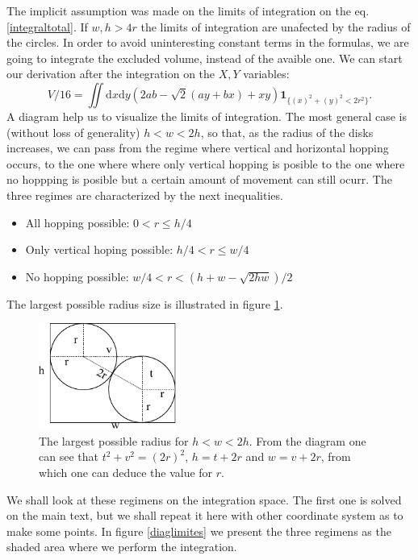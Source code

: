 \documentclass[letterpaper,10pt, jcp, aps]{revtex4-1}
\newcommand{\rd}{\!\mathrm{d}}
\newcommand{\indicator}[1]{\mathbf{1}_{ \{   #1 \} } }
\begin{document}
The implicit assumption was made on the limits of integration on
the eq. \ref{integraltotal}. If $w,h>4r$ the limits of integration
are unafected by the radius of the circles.
In order to avoid uninteresting constant terms
in the formulas, we are going to integrate
the excluded volume, instead of the avaible one. We can start
our derivation after the integration on the $X,Y$ variables:
\begin{equation}\label{VolumenGeneral}
V/16 =\iint \rd x \rd y (2ab-\sqrt{2}(ay+bx)+x y)
\indicator{(x)^2+(y)^2<2r^2 }.
\end{equation}
A diagram help us to visualize the limits of integration. The most general
case is (without loss of generality) $h<w<2h$, so that, as the radius of the
disks increases, we can pass from the regime where vertical and horizontal
hopping occurs, to the one where where only vertical hopping
is posible to the one where no hoppping is posible but a certain amount of movement
can still ocurr. The three regimes are characterized by the next inequalities.
\begin{itemize}
\item All hopping possible: $0<r \leq h/4$
\item Only vertical hoping possible: $h/4< r \leq w/4$
\item No hopping possible: $w/4<r<(h+w-\sqrt{2hw})/2$
\end{itemize}
The largest possible radius size  is illustrated in figure \ref{radiomaximo}.
\begin{figure}[h]
  \centering
  \includegraphics[width=0.4\textwidth]{FigurasPerfectas/DiagramaRadioMaximo.pdf}
  \caption{The largest possible radius for $h<w<2h$. From the diagram
    one can see that $t^2+v^2=(2r)^2$, $h=t+2r$ and $w=v+2r$, from which
    one can deduce the value for $r$.}
  \label{radiomaximo}
\end{figure}
We shall look at these regimens on the integration space. The first one is solved
on the main text, but we shall repeat it here with other coordinate system as to
make some points. In figure \ref{diaglimites} we present the three regimens as
the shaded area where we perform the integration. 
  
\end{document}
